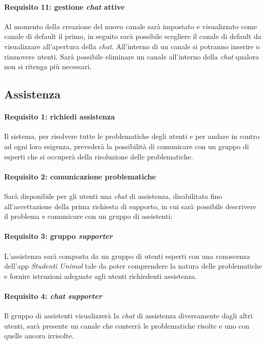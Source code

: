 \paragraph{Requisito 11: gestione \emph{chat} attive\\}
Al momento della creazione del nuovo canale sarà impostato e visualizzato come canale di default il primo, in seguito sarà possibile scegliere il canale di default da visualizzare all’apertura della \emph{chat}. All’interno di un canale si potranno inserire o rimuovere utenti. Sarà possibile eliminare un canale all’interno della \emph{chat} qualora non si ritenga più necessari.

\subsection {Assistenza}
\paragraph{Requisito 1: richiedi assistenza\\}
Il sistema, per risolvere tutte le problematiche degli utenti e per andare in contro ad ogni loro esigenza, prevederà la possibilità di comunicare con un gruppo di esperti che si occuperà della risoluzione delle problematiche.

\paragraph{Requisito 2: comunicazione problematiche\\}
Sarà disponibile per gli utenti una \emph{chat} di assistenza, disabilitata fino all’accettazione della prima richiesta di supporto, in cui sarà possibile descrivere il problema e comunicare con un gruppo di assistenti;

\paragraph{Requisito 3: gruppo \emph{supporter}\\}
L’assistenza sarà composta da un gruppo di utenti esperti con una conoscenza dell’app \emph{Studenti Unimol} tale da poter comprendere la natura delle problematiche e fornire istruzioni adeguate agli utenti richiedenti assistenza. 

\paragraph{Requisito 4: \emph{chat} \emph{supporter}\\}
Il gruppo di assistenti visualizzerà la \emph{chat} di assistenza diversamente dagli altri utenti, sarà presente un canale che conterrà le problematiche risolte e uno con quelle ancora irrisolte.

